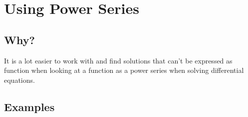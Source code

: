 \documentclass{article}
\begin{document}
\section{Using Power Series}

\subsection{Why?}

It is a lot easier to work with and find solutions that can't be expressed as function when looking at a function as a power series when solving differential equations.

\subsection{Examples}
\end{document}
